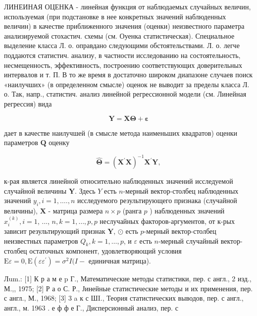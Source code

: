 \documentclass[10pt]{article}
\begin{document}
ЛИНЕИНАЯ ОЦЕНКА - линейная функция от наблюдаемых случайных величин, используемая (при подстановке в нее конкретных значений наблюденных величин) в качестве приближенного значения (оценки) неизвестного параметра анализируемой стохастич. схемы (см. Оуенка статистическая). Специальное выделение класса Л. о. оправдано следующими обстоятельствами. Л. о. легче поддаются статистич. анализу, в частности исследованию на состоятельность, несмещенность, эффективность, построению соответствующих доверительных интервалов и т. П. В то же время в достаточно широком диапазоне случаев поиск «наилучших» (в определенном смысле) оценок не выводит за пределы класса Л. о. Так, напр., статистич. анализ линейной регрессионной модели (см. Линейная регрессия) вида



\[

\boldsymbol{Y}=\boldsymbol{X} \boldsymbol{\Theta}+\boldsymbol{\varepsilon}

\]



дает в качестве наилучшей (в смысле метода наименьших квадратов) оценки параметров $\boldsymbol{Q}$ оценку



\[

\widehat{\boldsymbol{\Theta}}=\left(\boldsymbol{X}^{\prime} \boldsymbol{X}\right)^{-1} \boldsymbol{X}^{\prime} \boldsymbol{Y},

\]



к-рая является линейной относительно наблюденных значений исследуемой случайной величины $\boldsymbol{Y}$. Здесь $Y$ есть $n$-мерный вектор-столбец наблюденных значений $y_{i}, i=1, \ldots ., n$ исследуемого результирующего признака (случайной величины), $\boldsymbol{X}$ - матрица размера $n \times p$ (ранга $p$ ) наблюденных значений $x_{i}^{(k)}, i=1$, ..., $n, k=1, \ldots, p, p$ неслучайных факторов-аргументов, от к-рых зависит результирующий признак $\boldsymbol{Y}$, $\odot$ есть $p$-мерный вектор-столбец неизвестных параметров $Q_{k}, k=1, \ldots, p$, и $\varepsilon$ есть $n$-мерный случайный вектор-столбец остаточных компонент, удовлетворяющий условия $\mathrm{E} \varepsilon=0, \mathrm{E}\left(\varepsilon \varepsilon^{\prime}\right)=\sigma^{2} I(I-$ единичная матрица).



Лum.: [1] К р а м е p Г., Математические методы статистики, пер. с англ., 2 изд., М.,, 1975; [2] Р а о С. Р., Јинейные статистические методы и их применения, пер. с англ., М., 1968; [3] 3 a к с ШI., Теория статистических выводов, пер. с англ., англ., м. 1963 . е ф ф е Г., Дисперсионный анализ, пер. с
\end{document}
